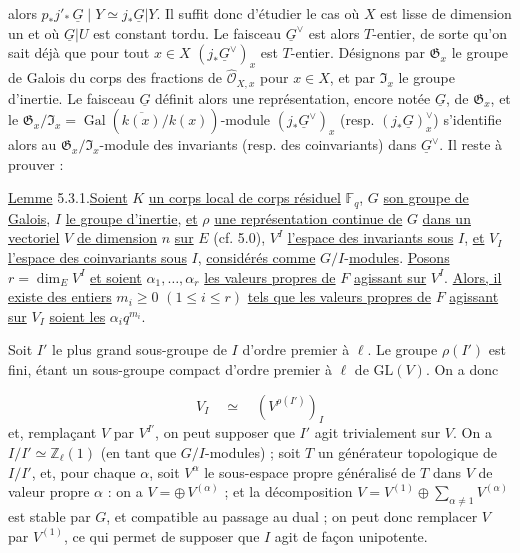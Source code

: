 alors $p_*j'_*\,\underline{G} \mid Y \simeq j_*\underline{G}|Y$. Il suffit donc d'étudier le cas où $X$ est lisse de dimension un et où $\underline{G}|U$ est constant tordu. Le faisceau $\underline{G}^\vee$ est alors $T$-entier, de sorte qu'on sait déjà que pour tout $x \in X$ $(j_* \underline{G}^\vee)_x$
est $T$-entier. Désignons par $\mathfrak{G}_x$ le groupe de Galois du corps des fractions de $\hat{\mathcal{O}}_{X,x}$ pour $x \in X$, et par $\mathfrak{I}_x$ le groupe d'inertie. Le faisceau $\underline{G}$ définit alors une représentation, encore notée $\underline{G}$, de $\mathfrak{G}_x$, et le $\mathfrak{G}_x/\mathfrak{I}_x = \operatorname{Gal}(\overline{k(x)}/k(x))$-module $(j_*\underline{G}^\vee)_x$ (resp. $(j_*\underline{G})_x^\vee$) s'identifie alors au $\mathfrak{G}_x/\mathfrak{I}_x$-module des invariants (resp. des coinvariants) dans $\underline{G}^\vee$. Il reste à prouver :

\underline{Lemme} 5.3.1.\quad \underline{Soient} $K$ \underline{un corps local de corps résiduel} $\mathbb{F}_q$, $G$ \underline{son groupe de Galois}, $I$ \underline{le groupe d'inertie}, \underline{et} $\rho$ \underline{une représentation continue de} $G$ \underline{dans un vectoriel} $V$ \underline{de dimension} $n$ \underline{sur} $E$ (cf. 5.0), $V^I$ \underline{l'espace des invariants sous} $I$, \underline{et} $V_I$ \underline{l'espace des coinvariants sous} $I$, \underline{considérés comme} $G/I$-\underline{modules}. \underline{Posons} $r=\dim_E V^I$ \underline{et soient} $\alpha_1,\ldots,\alpha_r$ \underline{les valeurs propres de} $F$ \underline{agissant sur} $V^I$. \underline{Alors, il existe des entiers} $m_i \geq 0$ $(1\leq i\leq r)$ \underline{tels que les valeurs propres de} $F$ \underline{agissant sur} $V_I$ \underline{soient les} $\alpha_i q^{m_i}$.

Soit $I'$ le plus grand sous-groupe de $I$ d'ordre premier à $\ell$. Le groupe $\rho(I')$ est fini, étant un sous-groupe compact d'ordre premier à $\ell$ de $\mathrm{GL}(V)$. On a donc

\begin{equation*}
V_I \quad \simeq \quad (V^{\rho(I')})_I
\end{equation*}
et, remplaçant $V$ par $V^{I'}$, on peut supposer que $I'$ agit trivialement sur $V$. On a $I/I' \simeq \mathbb{Z}_\ell(1)$ (en tant que $G/I$-modules) ; soit $T$ un générateur topologique de $I/I'$, et, pour chaque $\alpha$, soit $V^\alpha$ le sous-espace propre généralisé de $T$ dans $V$ de valeur propre $\alpha$ : on a $V = \oplus\, V^{(\alpha)}$ ; et la décomposition $V = V^{(1)} \oplus \sum_{\alpha \neq 1} V^{(\alpha)}$ est stable par $G$, et compatible
au passage au dual ; on peut donc remplacer $V$ par $V^{(1)}$, ce qui permet de supposer que $I$ agit de façon unipotente.


